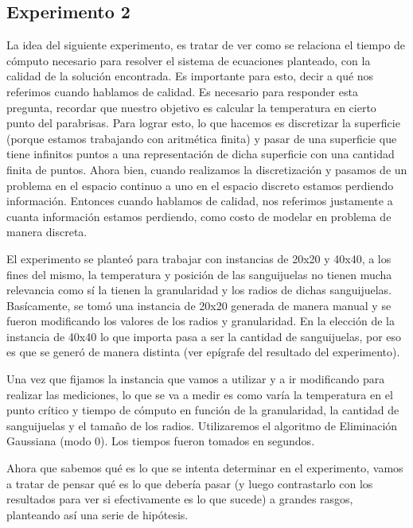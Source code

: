 \subsection{Experimento 2}
La idea del siguiente experimento, es tratar de ver como se relaciona el tiempo de cómputo necesario para resolver el sistema de ecuaciones planteado, con la calidad de la solución encontrada. Es importante para esto, decir a qué nos referimos cuando hablamos de calidad. Es necesario para responder esta pregunta, recordar que nuestro objetivo es calcular la temperatura en cierto punto del parabrisas. Para lograr esto, lo que hacemos es discretizar la superficie (porque estamos trabajando con aritmética finita) y pasar de una superficie que tiene infinitos puntos a una representación de dicha superficie con una cantidad finita de puntos. Ahora bien, cuando realizamos la discretización y pasamos de un problema en el espacio continuo a uno en el espacio discreto estamos perdiendo información. Entonces cuando hablamos de calidad, nos referimos justamente a cuanta información estamos perdiendo, como costo de modelar en problema de manera discreta.
\par El experimento se planteó para trabajar con instancias de 20x20 y 40x40, a los fines del mismo, la temperatura y posición de las sanguijuelas no tienen mucha relevancia como sí la tienen la granularidad y los radios de dichas sanguijuelas. Basícamente, se tomó una instancia de 20x20 generada de manera manual y se fueron modificando los valores de los radios y granularidad. En la elección de la instancia de 40x40 lo que importa pasa a ser la cantidad de sanguijuelas, por eso es que se generó de manera distinta (ver epígrafe del resultado del experimento).
\par Una vez que fijamos la instancia que vamos a utilizar y a ir modificando para realizar las mediciones, lo que se va a medir es como varía la temperatura en el punto crítico y tiempo de cómputo en función de la granularidad, la cantidad de sanguijuelas y el tamaño de los radios. Utilizaremos el algoritmo de Eliminación Gaussiana (modo 0). Los tiempos fueron tomados en segundos.
\newline \par Ahora que sabemos qué es lo que se intenta determinar en el experimento, vamos a tratar de pensar qué es lo que debería pasar (y luego contrastarlo con los resultados para ver si efectivamente es lo que sucede) a grandes rasgos, planteando así una serie de hipótesis. 
